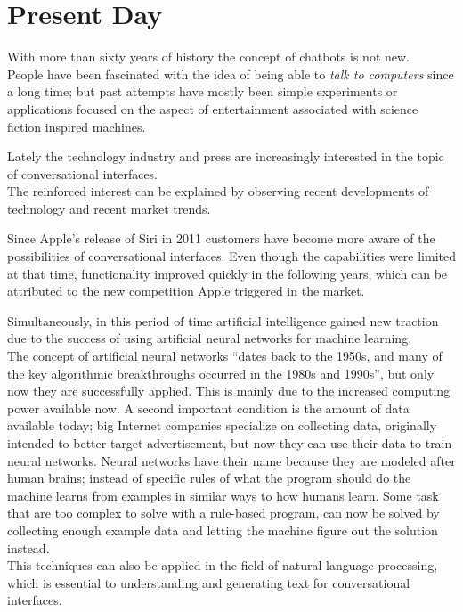 \section{Present Day} \label{presentday}


With more than sixty years of history the concept of chatbots is not new.
\\
People have been fascinated with the idea of being able to \emph{talk to computers} since a long time; but past attempts have mostly been simple experiments or applications focused on the aspect of entertainment associated with science fiction inspired machines.

Lately the technology industry and press are increasingly interested in the topic of conversational interfaces.
\\
The reinforced interest can be explained by observing recent developments of technology and recent market trends.

Since Apple's release of Siri in 2011\cite{iphonelaunch} customers have become more aware of the possibilities of conversational interfaces. Even though the capabilities were limited at that time, functionality improved quickly in the following years, which can be attributed to the new competition Apple triggered in the market.

Simultaneously, in this period of time artificial intelligence gained new traction due to the success of using artificial neural networks for machine learning\cite{mltrend}.
\\
The concept of artificial neural networks ``dates back to the 1950s, and many of the key algorithmic breakthroughs occurred in the 1980s and 1990s''\cite{airevolution}, but only now they are successfully applied. This is mainly due to the increased computing power available now. A second important condition is the amount of data available today; big Internet companies specialize on collecting data, originally intended to better target advertisement, but now they can use their data to train neural networks. Neural networks have their name because they are modeled after human brains; instead of specific rules of what the program should do the machine learns from examples in similar ways to how humans learn. Some task that are too complex to solve with a rule-based program, can now be solved by collecting enough example data and letting the machine figure out the solution instead.
\\
This techniques can also be applied in the field of natural language processing, which is essential to understanding and generating text for conversational interfaces.
\\

